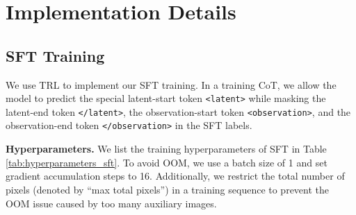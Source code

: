 \section{Implementation Details}
\label{app:implementation_details}
\subsection{SFT Training}
\label{app:sft}
We use TRL \citep{vonwerra2022trl} to implement our SFT training. In a training CoT, we allow the model to predict the special latent-start token \verb|<latent>| while masking the latent-end token \verb|</latent>|, the observation-start token \verb|<observation>|, and the observation-end token \verb|</observation>| in the SFT labels.

\textbf{Hyperparameters.}  We list the training hyperparameters of SFT in Table \ref{tab:hyperparameters_sft}. To avoid OOM, we use a batch size of 1 and set gradient accumulation steps to 16. Additionally, we restrict the total number of pixels (denoted by ``max total pixels'') in a training sequence to prevent the OOM issue caused by too many auxiliary images.
\begin{table}[htbp]
    \centering
    \caption{\textbf{Hyperparameters for SFT.} }
    \label{tab:hyperparameters_sft}
\end{table}




